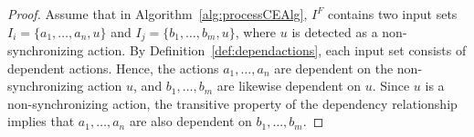 \begin{proof}
	
		Assume that in Algorithm~\ref{alg:processCEAlg}, %
        $I^F$ contains two input sets  $I_i=\{a_1,\ldots,a_n,u\}$ and $I_j=\{b_1,\ldots, b_m,u\}$, where $u$ is detected as a non-synchronizing action. By Definition~\ref{def:dependactions}, 
	each input set consists of dependent actions. Hence, the actions $a_1,\ldots,a_n$ are dependent on the non-synchronizing action $u$, and $b_1,\ldots,b_m$  are likewise dependent on $u$. Since $u$ is a non-synchronizing action, the transitive property of the dependency relationship implies that $a_1,\ldots,a_n$ are also dependent on $b_1,\ldots,b_m$. %
\end{proof}

